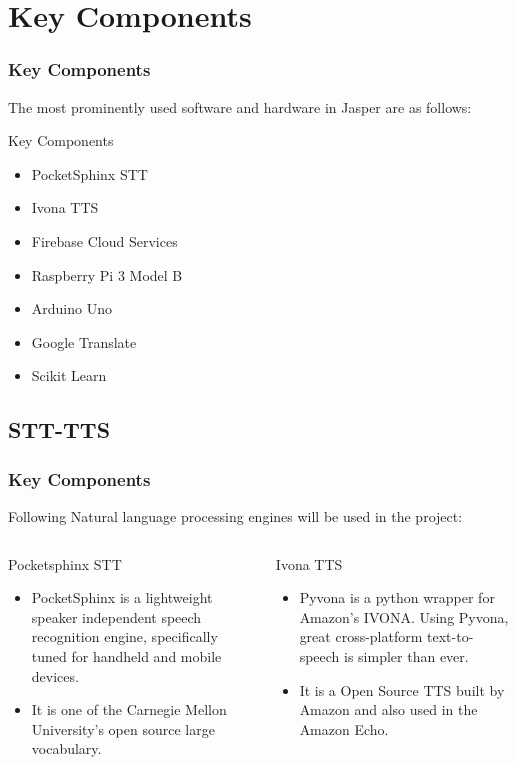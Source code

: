 \documentclass[xcolor=dvipsnames]{beamer}
\begin{document}
\section{Key Components}
\begin{frame}
\frametitle{Key Components}
The most prominently used software and hardware in Jasper are as follows:
\begin{alertblock}{Key Components}
\begin{itemize}
\item PocketSphinx STT
\item Ivona TTS
\item Firebase Cloud Services
\item Raspberry Pi 3 Model B
\item Arduino Uno
\item Google Translate
\item Scikit Learn
\end{itemize}
\end{alertblock}
\end{frame}
\subsection{STT-TTS}
\begin{frame}[fragile]
\frametitle{Key Components}
Following Natural language processing engines will be used in the project:
\begin{columns}[c]
\begin{exampleblock}{\small{Pocketsphinx STT}}
\begin{itemize}
\item PocketSphinx is a lightweight speaker independent speech recognition engine, specifically tuned for handheld and mobile devices.
\item It is one of the Carnegie Mellon University's open source large vocabulary.
\end{itemize}
\end{exampleblock}

\begin{exampleblock}{\small{Ivona TTS}}
\begin{itemize}
\item Pyvona is a python wrapper for Amazon’s IVONA. Using Pyvona, great cross-platform text-to-speech is simpler than ever.
\item It is a Open Source TTS built by Amazon and also used in the Amazon Echo.
\end{itemize}

\end{exampleblock}
\end{columns}
\end{frame}
\end{document}
